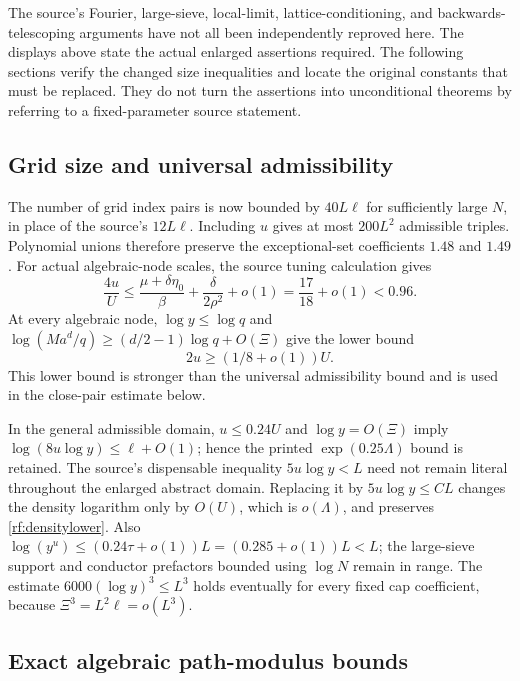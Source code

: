\begin{remark}
The source's Fourier, large-sieve, local-limit, lattice-conditioning,
and backwards-telescoping arguments have not all been independently
reproved here.  The displays above state the actual enlarged
assertions required.  The following sections verify the changed
size inequalities and locate the original constants that must be
replaced.  They do not turn the assertions into unconditional
theorems by referring to a fixed-parameter source statement.
\end{remark}

\subsection{Grid size and universal admissibility}

The number of grid index pairs is now bounded by $40L\ell$ for
sufficiently large $N$, in place of the source's $12L\ell$.
Including $u$ gives at most $200L^2$ admissible triples.
Polynomial unions therefore preserve the exceptional-set
coefficients $1.48$ and $1.49$.
For actual algebraic-node scales, the source tuning calculation gives
\[
 \frac{4u}{U}\le
 \frac{\mu+\delta\eta_0}{\beta}+
       \frac{\delta}{2\rho^2}+o(1)
 =\frac{17}{18}+o(1)<0.96.
\]
At every algebraic node, $\log y\le\log q$ and
$\log(Ma^d/q)\ge(d/2-1)\log q+O(\Xi)$ give the lower bound
\begin{equation}
 2u\ge(1/8+o(1))U.
 \label{rf:algu-lower}
\end{equation}
This lower bound is stronger than the universal admissibility bound
and is used in the close-pair estimate below.

In the general admissible domain, $u\le0.24U$ and
$\log y=O(\Xi)$ imply
$\log(8u\log y)\le\ell+O(1)$; hence the printed
$\exp(0.25\Lambda)$ bound is retained.
The source's dispensable inequality $5u\log y<L$ need not remain
literal throughout the enlarged abstract domain.  Replacing it by
$5u\log y\le C L$ changes the density logarithm only by $O(U)$,
which is $o(\Lambda)$, and preserves \eqref{rf:densitylower}.
Also $\log(y^u)\le(0.24\tau+o(1))L=(0.285+o(1))L<L$;
the large-sieve support and conductor prefactors bounded using
$\log N$ remain in range.  The estimate
$6000(\log y)^3\le L^3$ holds eventually for every fixed cap
coefficient, because $\Xi^3=L^2\ell=o(L^3)$.

\subsection{Exact algebraic path-modulus bounds}
\label{rf:path}

